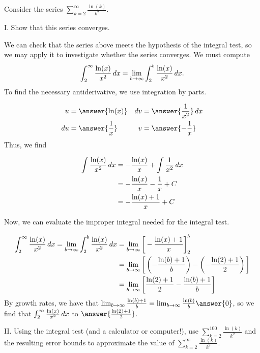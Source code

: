 \documentclass{ximera}
\begin{document}
\begin{example}
Consider the series $\sum_{k=2}^{\infty} \frac{\ln(k)}{k^2}$.  

I. Show that this series converges. 
\begin{explanation}
We can check that the series above meets the hypothesis of the integral test, so we may apply it to investigate whether the series converges.
We must compute 
\begin{align*}
\int_{2}^{\infty} \frac{\ln(x)}{x^2} \mathop{}\!d x &= \lim_{b \to \infty} \int_2^b  \frac{\ln(x)}{x^2} \mathop{}\!d x .\\
\end{align*}
To find the necessary antiderivative, we use integration by parts.

\begin{align*}
u&= \answer{\ln(x)} & \d v&= \answer{\frac{1}{x^2}} \d x \\
\d u &= \answer{\frac{1}{x}} & v&= \answer{-\frac{1}{x}}
\end{align*}
Thus, we find

\begin{align*}
\int  \frac{\ln(x)}{x^2} \mathop{}\!d x &= -\frac{\ln(x)}{x} + \int \frac{1}{x^2} \mathop{}\!d x \\
&= -\frac{\ln(x)}{x} - \frac{1}{x} +C \\
&= -\frac{\ln(x)+1}{x}+C
\end{align*}

Now, we can evaluate the improper integral needed for the integral test.

\begin{align*}
\int_{2}^{\infty} \frac{\ln(x)}{x^2} \mathop{}\!d x = \lim_{b \to \infty} \int_2^b  \frac{\ln(x)}{x^2} \mathop{}\!d x &= \lim_{b \to \infty} \bigg[ -\frac{\ln(x)+1}{x} \bigg]_2^b\\
&= \lim_{b \to \infty} \bigg[ \left(-\frac{\ln(b)+1}{b}\right) - \left(-\frac{\ln(2)+1}{2}\right) \bigg]\\
&= \lim_{b \to \infty} \bigg[ \frac{\ln(2)+1}{2}-\frac{\ln(b)+1}{b} \bigg]
\end{align*}
By growth rates, we have that $\lim_{b \to \infty} \frac{\ln(b)+1}{b} = \lim_{b \to \infty} \frac{\ln(b)}{b} \answer{0}$, so we find that $\int_{2}^{\infty} \frac{\ln(x)}{x^2} \mathop{}\!d x$  to $\answer{\frac{\ln(2)+1}{2}}$.
 
\end{explanation}


II. Using the integral test (and a calculator or computer!), use $\sum_{k=2}^{100}  \frac{\ln(k)}{k^2}$ and the resulting error bounds to approximate the value of $\sum_{k=2}^{\infty}  \frac{\ln(k)}{k^2}$.


\end{example}
\end{document}
